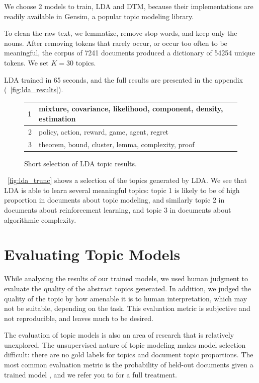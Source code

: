 \documentclass[letterpaper]{article}
\begin{document}
We choose 2 models to train, LDA and DTM, because their
implementations are readily available in Gensim, a popular topic
modeling library.

To clean the raw text, we lemmatize, remove stop words, and keep only
the nouns. After removing tokens that rarely occur, or occur too often
to be meaningful, the corpus of 7241 documents produced a dictionary
of 54254 unique tokens. We set $K = 30$ topics.

LDA trained in 65 seconds, and the full results are presented in the
appendix (~\autoref{fig:lda_results}). 

\begin{figure}[ht]
  \begin{tabularx}{\linewidth}{|r | X|}
    \hline
    1 & mixture, covariance, likelihood, component, density, estimation \\ \hline
    2 & policy, action, reward, game, agent, regret \\ \hline
    3 & theorem, bound, cluster, lemma, complexity, proof \\ \hline
  \end{tabularx}
  \caption{\label{fig:lda_trunc} Short selection of LDA topic results.}
\end{figure}

~\autoref{fig:lda_trunc} shows a selection of the topics generated by
LDA. We see that LDA is able to learn several meaningful topics: topic
1 is likely to be of high proportion in documents about topic
modeling, and similarly topic 2 in documents about reinforcement
learning, and topic 3 in documents about algorithmic complexity.

\section{Evaluating Topic Models}
\label{sec:evaluation}
While analysing the results of our trained models, we used human
judgment to evaluate the quality of the abstract topics generated. In
addition, we judged the quality of the topic by how amenable it is to
human interpretation, which may not be suitable, depending on the
task. This evaluation metric is subjective and not reproducible, and
leaves much to be desired.

The evaluation of topic models is also an area of research that is
relatively unexplored. The unsupervised nature of topic modeling makes
model selection difficult: there are no gold labels for topics and
document topic proportions. The most common evaluation metric is the
probability of held-out documents given a trained model
\cite{wallach2009evaluation}, and we refer you to
\citeauthor{wallach2009evaluation} for a full treatment.
\end{document}
